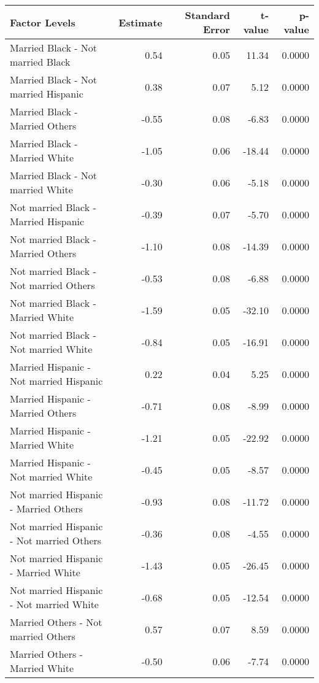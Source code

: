 \begin{table}[H]
\footnotesize
\centering
\begin{tabular}{lrrrr}
  \hline
Factor Levels & Estimate & Standard Error & t-value & p-value \\ 
  \hline
  Married Black -  Not married Black & 0.54 & 0.05 & 11.34 & 0.0000 \\ 
    Married Black -  Not married Hispanic & 0.38 & 0.07 & 5.12 & 0.0000 \\ 
    Married Black -  Married Others & -0.55 & 0.08 & -6.83 & 0.0000 \\ 
    Married Black -  Married White & -1.05 & 0.06 & -18.44 & 0.0000 \\ 
    Married Black -  Not married White & -0.30 & 0.06 & -5.18 & 0.0000 \\ 
    Not married Black -  Married Hispanic & -0.39 & 0.07 & -5.70 & 0.0000 \\ 
    Not married Black -  Married Others & -1.10 & 0.08 & -14.39 & 0.0000 \\ 
    Not married Black -  Not married Others & -0.53 & 0.08 & -6.88 & 0.0000 \\ 
    Not married Black -  Married White & -1.59 & 0.05 & -32.10 & 0.0000 \\ 
    Not married Black -  Not married White & -0.84 & 0.05 & -16.91 & 0.0000 \\ 
    Married Hispanic -  Not married Hispanic & 0.22 & 0.04 & 5.25 & 0.0000 \\ 
    Married Hispanic -  Married Others & -0.71 & 0.08 & -8.99 & 0.0000 \\ 
    Married Hispanic -  Married White & -1.21 & 0.05 & -22.92 & 0.0000 \\ 
    Married Hispanic -  Not married White & -0.45 & 0.05 & -8.57 & 0.0000 \\ 
    Not married Hispanic -  Married Others & -0.93 & 0.08 & -11.72 & 0.0000 \\ 
    Not married Hispanic -  Not married Others & -0.36 & 0.08 & -4.55 & 0.0000 \\ 
    Not married Hispanic -  Married White & -1.43 & 0.05 & -26.45 & 0.0000 \\ 
    Not married Hispanic -  Not married White & -0.68 & 0.05 & -12.54 & 0.0000 \\ 
    Married Others -  Not married Others & 0.57 & 0.07 & 8.59 & 0.0000 \\ 
    Married Others -  Married White & -0.50 & 0.06 & -7.74 & 0.0000 \\ 

\end{tabular}
\end{table}
